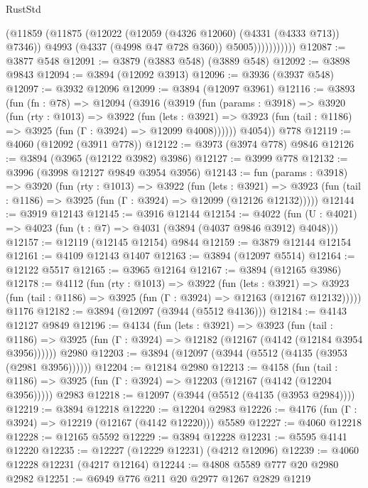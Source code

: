 \begin{lexlean}{RustStd}
\begin{coremodule}
                      (@11859
                        (@11875
                          (@12022 (@12059 (@4326 @12060) (@4331 (@4333 @713)) @7346))
                          @4993
                          (@4337 (@4998 @47 @728 @360))
                          @5005)))))))))))
@12087 := @3877 @548
@12091 := @3879 (@3883 @548) (@3889 @548)
@12092 := @3898 @9843
@12094 := @3894 (@12092 @3913)
@12096 := @3936 (@3937 @548)
@12097 := @3932 @12096
@12099 := @3894 (@12097 @3961)
@12116 := @3893
    (fun (fn : @78) =>
    @12094
      (@3916
        (@3919
          (fun (params : @3918) =>
          @3920
            (fun (rty : @1013) =>
            @3922
              (fun (lets : @3921) =>
              @3923 (fun (tail : @1186) => @3925 (fun (Γ : @3924) => @12099 @4008))))))
        @4054))
    @778
@12119 := @4060 (@12092 (@3911 @778))
@12122 := @3973 (@3974 @778) @9846
@12126 := @3894 (@3965 (@12122 @3982) @3986)
@12127 := @3999 @778
@12132 := @3996 (@3998 @12127 @9849 @3954 @3956)
@12143 := fun (params : @3918) =>
  @3920
    (fun (rty : @1013) =>
    @3922
      (fun (lets : @3921) =>
      @3923 (fun (tail : @1186) => @3925 (fun (Γ : @3924) => @12099 (@12126 @12132)))))
@12144 := @3919 @12143
@12145 := @3916 @12144
@12154 := @4022 (fun (U : @4021) => @4023 (fun (t : @7) => @4031 (@3894 (@4037 @9846 @3912) @4048)))
@12157 := @12119 (@12145 @12154) @9844
@12159 := @3879 @12144 @12154
@12161 := @4109 @12143 @1407
@12163 := @3894 (@12097 @5514)
@12164 := @12122 @5517
@12165 := @3965 @12164
@12167 := @3894 (@12165 @3986)
@12178 := @4112
    (fun (rty : @1013) =>
    @3922
      (fun (lets : @3921) =>
      @3923 (fun (tail : @1186) => @3925 (fun (Γ : @3924) => @12163 (@12167 @12132)))))
    @1176
@12182 := @3894 (@12097 (@3944 (@5512 @4136)))
@12184 := @4143 @12127 @9849
@12196 := @4134
    (fun (lets : @3921) =>
    @3923
      (fun (tail : @1186) =>
      @3925 (fun (Γ : @3924) => @12182 (@12167 (@4142 (@12184 @3954 @3956))))))
    @2980
@12203 := @3894 (@12097 (@3944 (@5512 (@4135 (@3953 (@2981 @3956))))))
@12204 := @12184 @2980
@12213 := @4158
    (fun (tail : @1186) => @3925 (fun (Γ : @3924) => @12203 (@12167 (@4142 (@12204 @3956)))))
    @2983
@12218 := @12097 (@3944 (@5512 (@4135 (@3953 @2984))))
@12219 := @3894 @12218
@12220 := @12204 @2983
@12226 := @4176 (fun (Γ : @3924) => @12219 (@12167 (@4142 @12220))) @5589
@12227 := @4060 @12218
@12228 := @12165 @5592
@12229 := @3894 @12228
@12231 := @5595 @4141 @12220
@12235 := @12227 (@12229 @12231) (@4212 @12096)
@12239 := @4060 @12228 @12231 (@4217 @12164)
@12244 := @4808 @5589 @777 @20 @2980 @2982
@12251 := @6949 @776 @211 @20 @2977 @1267 @2829 @1219

\end{coremodule}
\end{lexlean}
